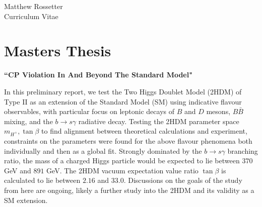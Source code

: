 \documentclass[10pt]{article} %
\begin{document}
\begin{paracol}{2} %


\parbox[top][0.12\textheight][c]{\linewidth}{ %
	\vspace{-0.04\textheight} %
	\centering %
	{\sffamily\Huge Matthew Rossetter}\\\medskip %
	{\Huge\color{headings}\cvtextfont Curriculum Vitae}
}


\section{Masters Thesis}

{\raggedright\textbf{``CP Violation In And Beyond The Standard Model"}\\\medskip}

In this preliminary report, we test the Two Higgs Doublet Model (2HDM) of Type II as an extension of the Standard Model (SM) using indicative flavour observables, with particular focus on leptonic decays of $B$ and $D$ mesons, $B\bar{B}$ mixing, and the $b\to s\gamma$ radiative decay.
Testing the 2HDM parameter space $m_{H^+},\tan\beta$ to find alignment between theoretical calculations and experiment, constraints on the parameters were found for the above flavour phenomena both individually and then as a global fit. Strongly dominated by the $b\to s\gamma$ branching ratio, the mass of a charged Higgs particle would be expected to lie between $370$ GeV and $891$ GeV. 
The 2HDM vacuum expectation value ratio $\tan\beta$ is calculated to lie between $2.16$ and $33.0$.
Discussions on the goals of the study from here are ongoing, likely a further study into the 2HDM and its validity as a SM extension. 



\end{paracol}
\end{document}
